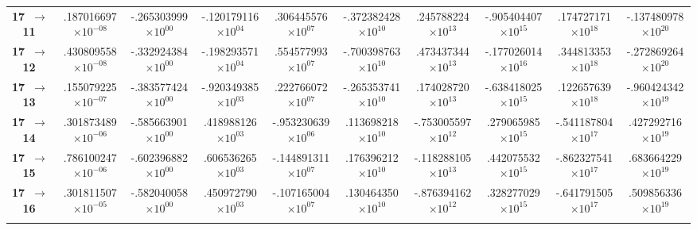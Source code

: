 \documentclass[reviewcopy]{elsarticle}
\begin{document}
\begin{landscape}
\begin{longtable}{lccccccccc}
{\bf 17~$\to$~ 11}  &   .187016697$\times10^{-08}$ & -.265303999$\times10^{ 00}$ & -.120179116$\times10^{ 04}$ &  .306445576$\times10^{ 07}$ & -.372382428$\times10^{ 10}$ &  .245788224$\times10^{ 13}$ & -.905404407$\times10^{ 15}$ &  .174727171$\times10^{ 18}$ & -.137480978$\times10^{ 20}$ \\
{\bf 17~$\to$~ 12}  &   .430809558$\times10^{-08}$ & -.332924384$\times10^{ 00}$ & -.198293571$\times10^{ 04}$ &  .554577993$\times10^{ 07}$ & -.700398763$\times10^{ 10}$ &  .473437344$\times10^{ 13}$ & -.177026014$\times10^{ 16}$ &  .344813353$\times10^{ 18}$ & -.272869264$\times10^{ 20}$ \\
{\bf 17~$\to$~ 13}  &   .155079225$\times10^{-07}$ & -.383577424$\times10^{ 00}$ & -.920349385$\times10^{ 03}$ &  .222766072$\times10^{ 07}$ & -.265353741$\times10^{ 10}$ &  .174028720$\times10^{ 13}$ & -.638418025$\times10^{ 15}$ &  .122657639$\times10^{ 18}$ & -.960424342$\times10^{ 19}$ \\
{\bf 17~$\to$~ 14}  &   .301873489$\times10^{-06}$ & -.585663901$\times10^{ 00}$ &  .418988126$\times10^{ 03}$ & -.953230639$\times10^{ 06}$ &  .113698218$\times10^{ 10}$ & -.753005597$\times10^{ 12}$ &  .279065985$\times10^{ 15}$ & -.541187804$\times10^{ 17}$ &  .427292716$\times10^{ 19}$ \\
{\bf 17~$\to$~ 15}  &   .786100247$\times10^{-06}$ & -.602396882$\times10^{ 00}$ &  .606536265$\times10^{ 03}$ & -.144891311$\times10^{ 07}$ &  .176396212$\times10^{ 10}$ & -.118288105$\times10^{ 13}$ &  .442075532$\times10^{ 15}$ & -.862327541$\times10^{ 17}$ &  .683664229$\times10^{ 19}$ \\
{\bf 17~$\to$~ 16}  &   .301811507$\times10^{-05}$ & -.582040058$\times10^{ 00}$ &  .450972790$\times10^{ 03}$ & -.107165004$\times10^{ 07}$ &  .130464350$\times10^{ 10}$ & -.876394162$\times10^{ 12}$ &  .328277029$\times10^{ 15}$ & -.641791505$\times10^{ 17}$ &  .509856336$\times10^{ 19}$ \\[3pt]
\hline \\
\end{longtable}
\normalsize
\renewcommand{\thefootnote}{\arabic{footnote}}
\renewcommand{\arraystretch}{1.0}
\end{landscape}
\end{document}
